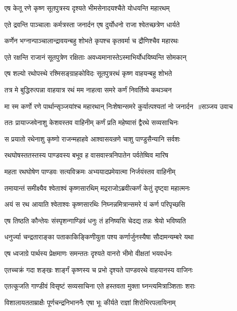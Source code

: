 \twolineshloka
{एष केतू रणे कृष्ण सूतपुत्रस्य दृश्यते}
{भीमसेनादयश्चैते योधयन्ति महारथम्}


\twolineshloka
{एते द्रवन्ति पाञ्चालाः कर्मत्रस्ता जनार्दन}
{एष दुर्योधनो राजा श्वेतच्छत्रेण धार्यते}


\twolineshloka
{कर्णेन भग्नान्पाञ्चालान्द्रावयन्बहु शोभते}
{कृपश्च कृतवर्मा च द्रौणिश्चैव महारथः}


\twolineshloka
{एते रक्षन्ति राजानं सूतपुत्रेण रक्षिताः}
{अवध्यमानास्तेऽस्माभिर्योधयिष्यन्ति सोमकान्}


\twolineshloka
{एष शल्यो रथोपस्थे रश्मिसङ्ग्राहकोविदः}
{सूतपुत्ररथं कृष्ण वाहयन्बहु शोभते}


\twolineshloka
{तत्र मे बुद्धिरुत्पन्ना वाहयात्र रथं मम}
{नाहत्वा समरे कर्णं निवर्तिष्ये कथञ्चन}


\threelineshloka
{मा स्म कर्णो रणे पार्थान्सृञ्जयांश्च महारथान्}
{निःशेषान्समरे कुर्यात्पश्यतां नो जनार्दन ॥सञ्जय उवाच}
{}


\twolineshloka
{ततः प्रायाज्जवेनाशु केशवस्तव वाहिनीम्}
{कर्णं प्रति महेष्वासं द्वैरथे सव्यसाचिनः}


\twolineshloka
{स प्रयातो रथेनाशु कृष्णो राजन्महाहवे}
{आश्वासयन्रणे चाशु पाण्डुसैन्यानि सर्वशः}


\twolineshloka
{रथघोषस्ततस्तस्य पाण्डवस्य बभूव ह}
{वासवास्त्रनिपातेन पर्वतेष्विव मारिष}


\twolineshloka
{महता रथघोषेण पाण्डवः सत्यविक्रमः}
{अभ्ययादप्रमेयात्मा निर्जयंस्तव वाहिनीम्}


\twolineshloka
{तमायान्तं समीक्ष्यैव श्वेताश्वं कृष्णसारथिम्}
{मद्रराजोऽब्रवीत्कर्णं केतुं दृष्ट्वा महात्मनः}


\twolineshloka
{अयं स रथ आयाति श्वेताश्वः कृष्णसारथिः}
{निघ्नन्नमित्रान्समरे यं कर्ण परिपृच्छसि}


\twolineshloka
{एष तिष्ठति कौन्तेयः संस्पृशन्गाण्डिवं धनुः}
{तं हनिष्यसि चेदद्य तन्नः श्रेयो भविष्यति}


\twolineshloka
{धनुर्ज्या चन्द्रताराङ्का पताकाकिङ्किणीयुता}
{पश्य कर्णार्जुनस्यैषा सौदामन्यम्बरे यथा}


\twolineshloka
{एष ध्वजाग्रे पार्थस्य प्रेक्षमाणः समन्ततः}
{दृश्यते वानरो भीमो वीक्षतां भयवर्धनः}


\twolineshloka
{एतच्चक्रं गदा शङ्खः शार्ङ्गं कृष्णस्य च प्रभो}
{दृश्यते पाण्डवरथे वाहयानस्य वाजिनः}


\twolineshloka
{एतत्कूजति गाण्डीवं विसृष्टं सव्यसाचिना}
{एते हस्तवता मुक्ता घ्नन्त्यमित्राञ्शिताः शराः}


\twolineshloka
{विशालायतताम्राक्षैः पूर्णचन्द्रनिभाननैः}
{एषा भूः कीर्यते राज्ञां शिरोभिरपलायिनाम्}


